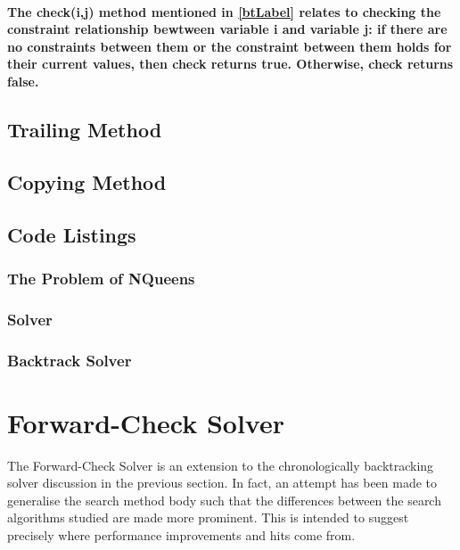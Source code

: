 \documentclass{article}
\begin{document}
\paragraph*{The check(i,j) method mentioned in \ref{btLabel} relates to checking the constraint relationship bewtween variable i and variable j: if there are no constraints between them or the constraint between them holds for their current values, then check returns true. Otherwise, check returns false.}

\subsection*{Trailing Method}
\subsection*{Copying Method}

\subsection*{Code Listings}
\subsubsection*{The Problem of NQueens}



\subsubsection*{Solver}


\subsubsection*{Backtrack Solver}


\section*{Forward-Check Solver}

The Forward-Check Solver is an extension to the chronologically backtracking solver discussion in the previous section. In fact, an attempt has been made to generalise the search method body such that the differences between the search algorithms studied are made more prominent. This is intended to suggest precisely where performance improvements and hits come from. 
\end{document}
